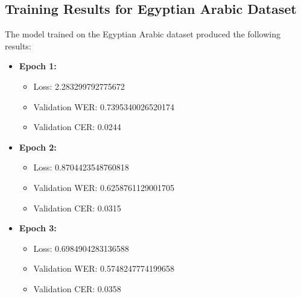 \documentclass[a4paper,12pt]{article}
\begin{document}

\subsection*{Training Results for Egyptian Arabic Dataset}

The model trained on the Egyptian Arabic dataset produced the following results:

\begin{itemize}
    \item \textbf{Epoch 1:}
    \begin{itemize}
        \item Loss: 2.283299792775672
        \item Validation WER: 0.7395340026520174
        \item Validation CER:  0.0244
    \end{itemize}
    \item \textbf{Epoch 2:}
    \begin{itemize}
        \item Loss: 0.8704423548760818
        \item Validation WER: 0.6258761129001705
        \item Validation CER: 0.0315
    \end{itemize}
    \item \textbf{Epoch 3:}
    \begin{itemize}
        \item Loss: 0.6984904283136588
        \item Validation WER: 0.5748247774199658
        \item Validation CER: 0.0358
    \end{itemize}
\end{itemize}
\end{document}
